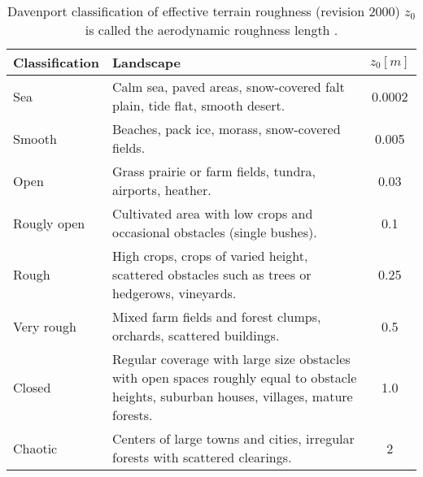 
\begin{table}[htbp]
\footnotesize
\centering
\captionsetup{format=plain}	
	\caption[Davenport classification of effective terrain roughness]{Davenport classification of effective terrain roughness (revision 2000) \textemdash $z_0$ is called the aerodynamic roughness length \citep{Wallace2006}.}
	\begin{tabular}{@{}lp{9cm}S@{}}
		\addlinespace
		\toprule
		Classification & Landscape & {$z_0 [m]$} \\
		\midrule
		Sea   & Calm sea, paved areas, snow-covered falt plain, tide flat, smooth desert. & 0.0002 \\
		Smooth & Beaches, pack ice, morass, snow-covered fields. & 0.005 \\
		Open  & Grass prairie or farm fields, tundra, airports, heather. & 0.03 \\
		Rougly open & Cultivated area with low crops and occasional obstacles (single bushes). & 0.1 \\
		Rough & High crops, crops of varied height, scattered obstacles such as trees or hedgerows, vineyards. & 0.25 \\
		Very rough & Mixed farm fields and forest clumps, orchards, scattered buildings. & 0.5 \\
		Closed & Regular coverage with large size obstacles with open spaces roughly equal to obstacle heights, suburban houses, villages, mature forests. & 1.0 \\
		Chaotic & Centers of large towns and cities, irregular forests with  scattered clearings. & 2 \\
		\bottomrule
	\end{tabular}%
	\label{tab:davenport_roughness_class}%
\end{table}%
